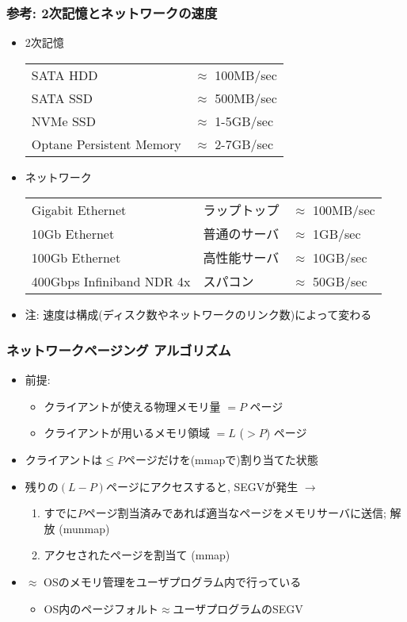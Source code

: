 \documentclass[12pt,dvipdfmx]{beamer}
\begin{document}
    
\begin{frame}
  \frametitle{参考: 2次記憶とネットワークの速度}
  \begin{itemize}
  \item 2次記憶

    {\small
        \begin{tabular}{|l|l|}\hline
          SATA HDD & $\approx$ 100MB/sec \\
          SATA SSD & $\approx$ 500MB/sec \\
          NVMe SSD & $\approx$ 1-5GB/sec \\
          Optane Persistent Memory & $\approx$ 2-7GB/sec \\\hline
        \end{tabular}}

  \item ネットワーク

    {\small
        \begin{tabular}{|l|l|l|}\hline
          Gigabit Ethernet & ラップトップ & $\approx$ 100MB/sec \\
          10Gb Ethernet & 普通のサーバ & $\approx$ 1GB/sec \\
          100Gb Ethernet & 高性能サーバ & $\approx$ 10GB/sec \\
          400Gbps Infiniband NDR 4x & スパコン & $\approx$ 50GB/sec \\\hline
        \end{tabular}}

  \item 注: 速度は構成(ディスク数やネットワークのリンク数)によって変わる
  \end{itemize}
\end{frame}

\begin{frame}
  \frametitle{ネットワークページング アルゴリズム}
  \begin{itemize}
  \item 前提:
    \begin{itemize}
    \item クライアントが使える物理メモリ量 $= P$ ページ
    \item クライアントが用いるメモリ領域 $= L$ ($> P$) ページ 
    \end{itemize}
  \item クライアントは$\leq P$ページだけを(mmapで)割り当てた状態
  \item 残りの$(L -P)$ページにアクセスすると, SEGVが発生 $\rightarrow$
    \begin{enumerate}
    \item すでに$P$ページ割当済みであれば適当なページをメモリサーバに送信; 解放 (munmap)
    \item アクセされたページを割当て (mmap)
    \end{enumerate}
  \item $\approx$ OSのメモリ管理をユーザプログラム内で行っている
    \begin{itemize}
    \item OS内のページフォルト$\approx$ユーザプログラムのSEGV
    \end{itemize}
  \end{itemize}
\end{frame}
\end{document}

